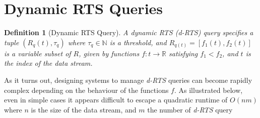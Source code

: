 \documentclass{article}
\newtheorem{definition}{Definition}
\begin{document}
\section*{Dynamic RTS Queries}

\begin{definition}[Dynamic RTS Query] A dynamic RTS (\textit{d-RTS}) query specifies a tuple $(R_q(t), \tau_q)$ where $\tau_q \in \mathbb{N}$
    is a threshold, and $R_{q(t)} =[f_1(t), f_2(t)]$ is a variable subset of $R$, given by functions $f: t\rightarrow\mathbb{R}$ satisfying $f_1 < f_2$, and $t$ is the index of the data stream.
\end{definition}

As it turns out, designing systems to manage \textit{d-RTS} queries can become rapidly complex depending on the behaviour of the functions $f$. As illustrated below, even in simple cases it appears difficult to escape a quadratic runtime of $O(nm)$ where $n$ is the size of the data stream, and $m$ the number of \textit{d-RTS} query
\end{document}

